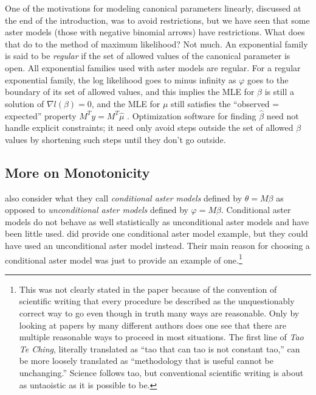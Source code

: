 \documentclass[11pt]{article}
\begin{document}
{\label{foot:restrict}
One of the motivations for modeling canonical parameters linearly, discussed
at the end of the introduction, was to avoid restrictions, but we have seen
that some aster models (those with negative binomial arrows) have restrictions.
What does that do to the method of maximum likelihood?  Not much.
An exponential family is said to be \emph{regular} if the set of allowed values
of the canonical parameter is open.  All exponential families used with aster
models are regular.  For a regular exponential family, the log likelihood goes
to minus infinity as $\varphi$ goes to the boundary
of its set of allowed values, and this implies the MLE for $\beta$ is still
a solution of $\nabla l(\beta) = 0$, and the MLE for $\mu$ still satisfies the
``observed = expected'' property $M^T y = M^T \hat{\mu}$
\citep[Corollary~9.6]{barndorff-nielsen}.
Optimization software for finding $\hat{\beta}$ need not handle explicit
constraints; it need only avoid steps outside
the set of allowed $\beta$ values by shortening such steps until they don't
go outside.}

\subsection{More on Monotonicity} \label{sec:moron}

\citet{aster1} also consider what they call \emph{conditional aster models}
defined by $\theta = M \beta$ as opposed to \emph{unconditional aster models}
defined by $\varphi = M \beta$.  Conditional aster models do not
behave as well statistically as unconditional aster models and have been little
used.  \citet{aster2} did provide one conditional aster model example,
but they could have used an unconditional aster model instead.
Their main reason for choosing a conditional aster model
was just to provide an example of one.\footnote{This was not clearly stated
in the paper because of the convention of
scientific writing that every procedure be described as the unquestionably
correct way to go even though in truth many ways are reasonable.  Only by
looking at papers by many different authors does one see that there are
multiple reasonable ways to proceed in most situations.
The first line of \emph{Tao Te Ching}, literally translated as
``tao that can tao is not constant tao,'' can be more loosely translated as
``methodology that is useful cannot be unchanging.''  Science follows tao,
but conventional scientific writing is about as untaoistic as it is possible
to be.}
\end{document}
